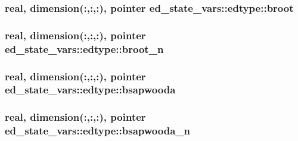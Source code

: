 \subsubsection[{\texorpdfstring{broot}{broot}}]{\setlength{\rightskip}{0pt plus 5cm}real, dimension(\+:,\+:,\+:), pointer ed\+\_\+state\+\_\+vars\+::edtype\+::broot}\hypertarget{structed__state__vars_1_1edtype_aed796e8ec3b7aaf11d72d7abad50ee10}{}\label{structed__state__vars_1_1edtype_aed796e8ec3b7aaf11d72d7abad50ee10}
\subsubsection[{\texorpdfstring{broot\+\_\+n}{broot_n}}]{\setlength{\rightskip}{0pt plus 5cm}real, dimension(\+:,\+:,\+:), pointer ed\+\_\+state\+\_\+vars\+::edtype\+::broot\+\_\+n}\hypertarget{structed__state__vars_1_1edtype_ad1591cea5906a745c8fbe2fe6d0bae18}{}\label{structed__state__vars_1_1edtype_ad1591cea5906a745c8fbe2fe6d0bae18}
\subsubsection[{\texorpdfstring{bsapwooda}{bsapwooda}}]{\setlength{\rightskip}{0pt plus 5cm}real, dimension(\+:,\+:,\+:), pointer ed\+\_\+state\+\_\+vars\+::edtype\+::bsapwooda}\hypertarget{structed__state__vars_1_1edtype_a533a9bdb7408a11b87cbeefb3fa7b457}{}\label{structed__state__vars_1_1edtype_a533a9bdb7408a11b87cbeefb3fa7b457}
\subsubsection[{\texorpdfstring{bsapwooda\+\_\+n}{bsapwooda_n}}]{\setlength{\rightskip}{0pt plus 5cm}real, dimension(\+:,\+:,\+:), pointer ed\+\_\+state\+\_\+vars\+::edtype\+::bsapwooda\+\_\+n}\hypertarget{structed__state__vars_1_1edtype_a9c627911bc9738677587cb69b4c4efb3}{}\label{structed__state__vars_1_1edtype_a9c627911bc9738677587cb69b4c4efb3}
